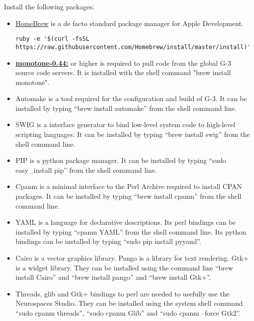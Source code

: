 \documentclass[12pt]{article}
\begin{document}
Install the following packages:
\begin{itemize}
\item[] \href{https://coolestguidesontheplanet.com/installing-homebrew-os-x-yosemite-10-10-package-manager-unix-apps/}{HomeBrew} is a de facto standard package manager for Apple Development.
\begin{verbatim}
ruby -e '$(curl -fsSL https://raw.githubusercontent.com/Homebrew/install/master/install)'
\end{verbatim}

\item[]\href{http://monotone.ca/}{\bf monotone-0.44:} or higher is required to pull code from the global G-3 source code servers.  It is installed with the shell command "brew install monotone".

\item[] Automake is a tool required for the configuration and build of G-3.  It can be installed by typing ``brew install automake'' from the shell command line.

\item[] SWIG is a interface generator to bind low-level system code to high-level scripting languages.  It can be installed by typing ``brew install swig'' from the shell command line.

\item[] PIP is a python package manager.  It can be installed by typing ``sudo easy\_install pip'' from the shell command line.

\item[] Cpanm is a minimal interface to the Perl Archive required to install CPAN packages.  It can be installed by typing ``brew install cpanm'' from the shell command line.

\item[] YAML is a language for declarative descriptions.  Its perl bindings can be installed by typing ``cpanm YAML'' from the shell command line.  Its python bindings can be installed by typing ``sudo pip install pyyaml''.

\item[] Cairo is a vector graphics library.  Pango is a library for text rendering.  Gtk+ is a widget library.  They can be installed using the command line ``brew install Cairo'' and ``brew install pango'' and ``brew install Gtk+''.

\item[] Threads, glib and Gtk+ bindings to perl are needed to usefully use the Neurospaces Studio.  They can be installed using the system shell command ``sudo cpanm threads'', ``sudo cpanm Glib'' and ``sudo cpanm --force Gtk2''.


\end{itemize}
\end{document}
